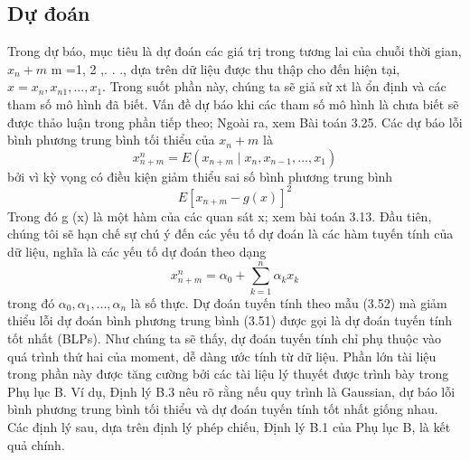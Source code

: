 \documentclass[12pt, a4paper,oneside]{book}
\theoremstyle{definition}
\begin{document}
\subsection{Dự đoán}
Trong dự báo, mục tiêu là dự đoán các giá trị trong tương lai của chuỗi thời gian, $x_{n} + m $ m =1, 2 ,. . ., dựa trên dữ liệu được thu thập cho đến hiện tại, $x = {x_{n}, x_{n1},. . . , x_{1}}$. Trong suốt phần này, chúng ta sẽ giả sử xt là ổn định và các tham số mô hình đã biết. Vấn đề dự báo khi các tham số mô hình là chưa biết sẽ được thảo luận trong phần tiếp theo; Ngoài ra, xem Bài toán 3.25. Các dự báo lỗi bình phương trung bình tối thiểu của $x_{n} + m$ là 
$$ x_{n+m}^n= E (x_{n+m}\mid x_{n}, x_{n-1},...,x_{1})$$
bởi vì kỳ vọng có điều kiện giảm thiểu sai số bình phương trung bình $$E[x_{n+m} - g(x)]^2$$
Trong đó g (x) là một hàm của các quan sát x; xem bài toán 3.13.
Đầu tiên, chúng tôi sẽ hạn chế sự chú ý đến các yếu tố dự đoán là các hàm tuyến tính của dữ liệu, nghĩa là các yếu tố dự đoán theo dạng
$$x_{n+m}^n =\alpha_{0} + \sum_{k=1}^{n} \alpha_{k} x_{k}$$
trong đó $\alpha_{0}, \alpha_{1} ,. . . , \alpha_{n}$ là số thực. Dự đoán tuyến tính theo mẫu (3.52)
mà giảm thiểu lỗi dự đoán bình phương trung bình (3.51) được gọi là dự đoán tuyến tính tốt nhất  (BLPs). Như chúng ta sẽ thấy, dự đoán tuyến tính chỉ phụ thuộc vào quá trình thứ hai của moment, dễ dàng ước tính từ dữ liệu. Phần lớn tài liệu trong phần này được tăng cường bởi các tài liệu lý thuyết được trình bày trong Phụ lục B. Ví dụ, Định lý B.3 nêu rõ rằng nếu quy trình là Gaussian, dự báo lỗi bình phương trung bình tối thiểu và dự đoán tuyến tính tốt nhất giống nhau. Các định lý sau, dựa trên định lý phép chiếu, Định lý B.1 của Phụ lục B, là kết quả chính.
\end{document}
